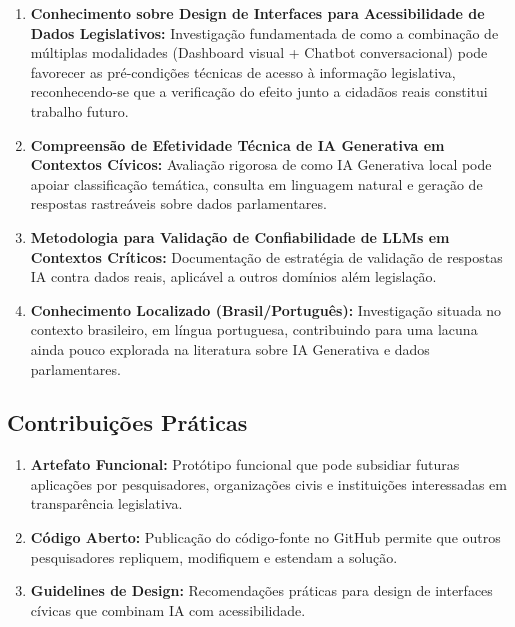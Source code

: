 \begin{enumerate}
    \item \textbf{Conhecimento sobre Design de Interfaces para Acessibilidade de Dados Legislativos:} Investigação fundamentada de como a combinação de múltiplas modalidades (Dashboard visual + Chatbot conversacional) pode favorecer as pré-condições técnicas de acesso à informação legislativa, reconhecendo-se que a verificação do efeito junto a cidadãos reais constitui trabalho futuro.

    \item \textbf{Compreensão de Efetividade Técnica de IA Generativa em Contextos Cívicos:} Avaliação rigorosa de como IA Generativa local pode apoiar classificação temática, consulta em linguagem natural e geração de respostas rastreáveis sobre dados parlamentares.

    \item \textbf{Metodologia para Validação de Confiabilidade de LLMs em Contextos Críticos:} Documentação de estratégia de validação de respostas IA contra dados reais, aplicável a outros domínios além legislação.

    \item \textbf{Conhecimento Localizado (Brasil/Português):} Investigação situada no contexto brasileiro, em língua portuguesa, contribuindo para uma lacuna ainda pouco explorada na literatura sobre IA Generativa e dados parlamentares.
\end{enumerate}

\subsection{Contribuições Práticas}

\begin{enumerate}
    \item \textbf{Artefato Funcional:} Protótipo funcional que pode subsidiar futuras aplicações por pesquisadores, organizações civis e instituições interessadas em transparência legislativa.

    \item \textbf{Código Aberto:} Publicação do código-fonte no GitHub permite que outros pesquisadores repliquem, modifiquem e estendam a solução.

    \item \textbf{Guidelines de Design:} Recomendações práticas para design de interfaces cívicas que combinam IA com acessibilidade.
\end{enumerate}

